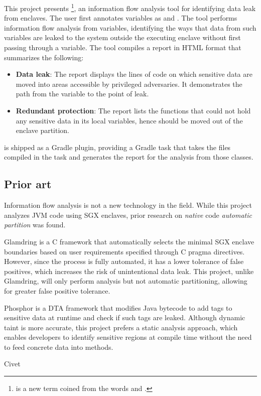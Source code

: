 This project presents \pname{}
\footnote{ is a new term coined from the words  and .},
an information flow analysis tool
for identifying data leak from enclaves.
The user first annotates variables as  and .
The tool performs information flow analysis from  variables,
identifying the ways that data from such variables are leaked
to the system outside the executing enclave
without first passing through a  variable.
The tool compiles a report in HTML format that summarizes the following:
\begin{itemize}
	\item \textbf{Data leak}:
		The report displays the lines of code on which sensitive data are moved
		into areas accessible by privileged adversaries.
		It demonstrates the path from the  variable to the point of leak.
	\item \textbf{Redundant protection}:
		The report lists the functions that could not hold any sensitive data in its local variables,
		hence should be moved out of the enclave partition.
\end{itemize}

\pname{} is shipped as a Gradle plugin,
providing a Gradle task that
takes the  files compiled in the  task
and generates the report for the analysis from those classes.

\subsection{Prior art}
Information flow analysis is not a new technology in the field.
While this project analyzes JVM code using SGX enclaves,
prior research on \emph{native} code \emph{automatic partition} was found.

Glamdring \cite{glamdring} is a C framework that
automatically selects the minimal SGX enclave boundaries
based on user requirements specified through C pragma directives.
However, since the process is fully automated,
it has a lower tolerance of false positives,
which increases the risk of unintentional data leak.
This project, unlike Glamdring, will only perform analysis but not automatic partitioning,
allowing for greater false positive tolerance.

Phosphor \cite{BellJonathan2014Pidd} is a DTA framework
that modifies Java bytecode to add tags to sensitive data at runtime
and check if such tags are leaked.
Although dynamic taint is more accurate,
this project prefers a static analysis approach,
which enables developers to identify sensitive regions at compile time
without the need to feed concrete data into methods.

Civet \cite{civet}
